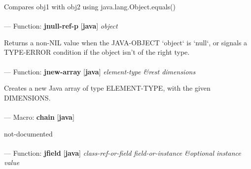 \begin{adjustwidth}{5em}{5em}
Compares obj1 with obj2 using java.lang.Object.equals()
\end{adjustwidth}

\paragraph{}
\label{JAVA:JNULL-REF-P}
--- Function: \textbf{jnull-ref-p} [\textbf{java}] \textit{object}

\begin{adjustwidth}{5em}{5em}
Returns a non-NIL value when the JAVA-OBJECT `object` is `null`,
or signals a TYPE-ERROR condition if the object isn't of
the right type.
\end{adjustwidth}

\paragraph{}
\label{JAVA:JNEW-ARRAY}
--- Function: \textbf{jnew-array} [\textbf{java}] \textit{element-type \&rest dimensions}

\begin{adjustwidth}{5em}{5em}
Creates a new Java array of type ELEMENT-TYPE, with the given DIMENSIONS.
\end{adjustwidth}

\paragraph{}
\label{JAVA:CHAIN}
--- Macro: \textbf{chain} [\textbf{java}] \textit{}

\begin{adjustwidth}{5em}{5em}
not-documented
\end{adjustwidth}

\paragraph{}
\label{JAVA:JFIELD}
--- Function: \textbf{jfield} [\textbf{java}] \textit{class-ref-or-field field-or-instance \&optional instance value}

